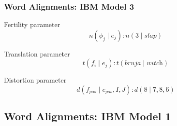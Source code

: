 \begin{frame}
\frametitle{Word Alignments: IBM Model 3}
\begin{block}{Fertility parameter}
\[ n(\phi_j \mid e_j) : n(3 \mid \textit{slap}) \]
\end{block}\pause
\begin{block}{Translation parameter}
\[ t(f_i \mid e_j) : t(\textit{bruja} \mid \textit{witch}) \]
\end{block}\pause
\begin{block}{Distortion parameter}
\[ d(f_{\textit{pos}} \mid e_{\textit{pos}}, I, J) : d(8 \mid 7, 8, 6) \]
\end{block}
\end{frame}

\subsection{Word Alignments: IBM Model 1}
\frame{\tableofcontents[currentsection]}

